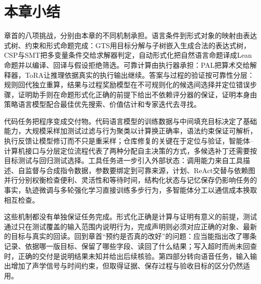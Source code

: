 \section{本章小结}
\label{sec:nlp-execution-summary}

章首的八项挑战，分别由本章的不同机制承担。语言条件到形式对象的映射由表达式树、约束和形式命题完成：GTS用目标分解与子树嵌入生成合法的表达式树，CSP与SMT把多变量条件交给求解器判定，自动形式化把自然语言命题译成Lean命题并以编译、回译与假设拒绝筛选。可靠计算由执行器承担：PAL把算术交给解释器，ToRA让推理依据真实的执行输出继续。答案与过程的验证按可靠性分层：规则回代独立重算，结果与过程奖励模型在不可规则化的候选间选择并定位错误步骤，证明助手则在命题形式化正确的前提下给出不依赖评分器的保证，证明本身由策略语言模型配合最佳优先搜索、价值估计和专家迭代去寻找。

代码任务把程序变成交付物。代码语言模型的训练数据与中间填充目标决定了基础能力，大规模采样加测试过滤与行为聚类以计算换正确率，语法约束保证可解析，执行反馈让模型修订而不只是重采样；仓库修复的关键在于定位与验证，智能体–计算机接口与分层定位流程代表了两种分配自主决策的方式，多候选补丁还需要按目标测试与回归测试选择。工具任务进一步引入外部状态：调用能力来自工具描述、自监督与合成指令数据，参数要绑定到可靠来源，计划、ReAct交替与依赖图并行分别权衡检查便利、灵活性和等待时间，结构化状态与记忆保存仍影响任务的事实，轨迹微调与多轮强化学习直接训练多步行为，多智能体分工以通信成本换取相互检查。

这些机制都没有单独保证任务完成。形式化正确是计算与证明有意义的前提，测试通过只在测试覆盖的输入范围内说明行为，完成声明则必须对应正确的对象、最新的目标与真实的回读。回到章首“预约是否真的改好”的问题：应当能指出改了哪条记录、依据哪一版目标、保留了哪些字段、读回了什么结果；写入超时而尚未回查时，正确的交付是说明结果未知并给出后续核验。第四部分转向语音任务，输入输出增加了声学信号与时间约束，但取得证据、保存过程与验收目标的区分仍然适用。
